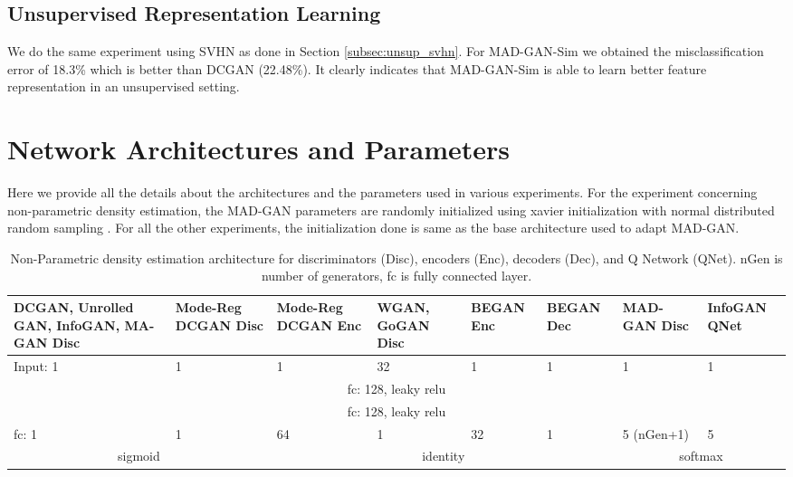 \subsection{Unsupervised Representation Learning}
We do the same experiment using SVHN as done in Section \ref{subsec:unsup_svhn}. For MAD-GAN-Sim we obtained the misclassification error of 18.3\% which is better than DCGAN (22.48\%). It clearly indicates that MAD-GAN-Sim is able to learn better feature representation in an unsupervised setting.

\section{Network Architectures and Parameters}
\label{sec:architectures}
Here we provide all the details about the architectures and the parameters used in various experiments. For the experiment concerning non-parametric density estimation, the MAD-GAN parameters are randomly initialized using xavier initialization with normal distributed random sampling \cite{glorot2010understanding}. For all the other experiments, the initialization done is same as the base architecture used to adapt MAD-GAN.

\begin{center}
	\begin{table*}
		\begin{tabular}{| m{10em} | m{5em} | m{5em} | m{4em} | m{4em} | m{4em} | m{4em} | m{4em} |}
			\hline
			\textbf{DCGAN, Unrolled GAN, InfoGAN, MA-GAN Disc} & \textbf{Mode-Reg DCGAN Disc} & \textbf{Mode-Reg DCGAN Enc} & \textbf{WGAN, GoGAN Disc} & \textbf{BEGAN Enc} & \textbf{BEGAN Dec} & \textbf{MAD-GAN Disc} & \textbf{InfoGAN QNet} \\
			\hline
			Input: 1 & 1 & 1 & 32 & 1 & 1 & 1 & 1 \\ 
			\hline
			\multicolumn{8}{|c|}{fc: 128, leaky relu}  \\
			\hline
			\multicolumn{8}{|c|}{fc: 128, leaky relu}  \\
			\hline
			fc: 1 & 1 & 64 & 1 & 32 & 1 & 5 (nGen+1) & 5 \\
			\hline
			\multicolumn{2}{|c|}{sigmoid} & \multicolumn{4}{|c|}{identity} & \multicolumn{2}{|c|}{softmax} \\
			\hline
		\end{tabular}
		\caption{\label{tab:toyDisc}Non-Parametric density estimation architecture for discriminators (Disc), encoders (Enc), decoders (Dec), and Q Network (QNet). nGen is number of generators, fc is fully connected layer.}
	\end{table*}
\end{center}

